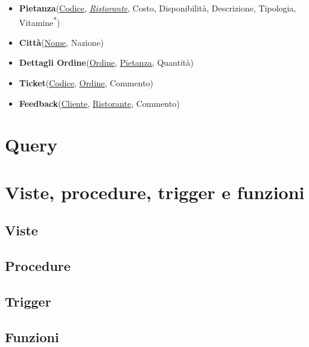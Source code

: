 \documentclass[10pt]{article}
\begin{document}
\begin{itemize}[noitemsep]
			\item[] \textbf{Pietanza}(\underline{Codice}, \underline{\textit{Ristorante}}, Costo, Disponibilità, Descrizione,	Tipologia, Vitamine\textsuperscript{*})
			\item[] \textbf{Città}(\underline{Nome}, Nazione)
			\item[] \textbf{Dettagli Ordine}(\underline{Ordine}, \underline{Pietanza}, Quantità)
			\item[] \textbf{Ticket}(\underline{Codice}, \underline{Ordine}, Commento)
			\item[] \textbf{Feedback}(\underline{Cliente}, \underline{Ristorante}, Commento)
			
		\end{itemize}
	\section{Query}
	\section{Viste, procedure, trigger e funzioni}
		\subsection{Viste}
		\subsection{Procedure}
		\subsection{Trigger}
		\subsection{Funzioni}
	
\end{document}
